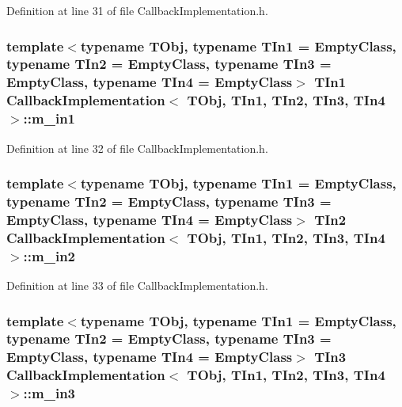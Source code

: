 Definition at line 31 of file Callback\-Implementation.\-h.

\hypertarget{class_callback_implementation_aa450e142f5f6b9a21d586cac4d678278}{
\subsubsection[{m\-\_\-in1}]{\setlength{\rightskip}{0pt plus 5cm}template$<$typename T\-Obj, typename T\-In1 = Empty\-Class, typename T\-In2 = Empty\-Class, typename T\-In3 = Empty\-Class, typename T\-In4 = Empty\-Class$>$ T\-In1 {\bf Callback\-Implementation}$<$ T\-Obj, T\-In1, T\-In2, T\-In3, T\-In4 $>$\-::m\-\_\-in1\hspace{0.3cm}{\ttfamily [private]}}}\label{class_callback_implementation_aa450e142f5f6b9a21d586cac4d678278}


Definition at line 32 of file Callback\-Implementation.\-h.

\hypertarget{class_callback_implementation_a47a012cc680635d68292e21e06a0b571}{
\subsubsection[{m\-\_\-in2}]{\setlength{\rightskip}{0pt plus 5cm}template$<$typename T\-Obj, typename T\-In1 = Empty\-Class, typename T\-In2 = Empty\-Class, typename T\-In3 = Empty\-Class, typename T\-In4 = Empty\-Class$>$ T\-In2 {\bf Callback\-Implementation}$<$ T\-Obj, T\-In1, T\-In2, T\-In3, T\-In4 $>$\-::m\-\_\-in2\hspace{0.3cm}{\ttfamily [private]}}}\label{class_callback_implementation_a47a012cc680635d68292e21e06a0b571}


Definition at line 33 of file Callback\-Implementation.\-h.

\hypertarget{class_callback_implementation_a5fe21028d85ca42abc4bd1c40b51e433}{
\subsubsection[{m\-\_\-in3}]{\setlength{\rightskip}{0pt plus 5cm}template$<$typename T\-Obj, typename T\-In1 = Empty\-Class, typename T\-In2 = Empty\-Class, typename T\-In3 = Empty\-Class, typename T\-In4 = Empty\-Class$>$ T\-In3 {\bf Callback\-Implementation}$<$ T\-Obj, T\-In1, T\-In2, T\-In3, T\-In4 $>$\-::m\-\_\-in3\hspace{0.3cm}{\ttfamily [private]}}}\label{class_callback_implementation_a5fe21028d85ca42abc4bd1c40b51e433}


